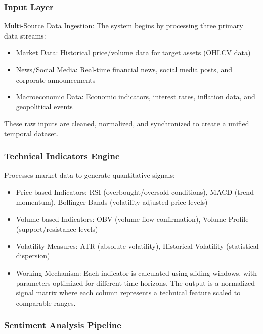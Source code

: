 \documentclass{singlecol-new}
\theoremstyle{TH}{
\newtheorem{lemma}{Lemma}
\newtheorem{theorem}[lemma]{Theorem}
\newtheorem{corrolary}[lemma]{Corrolary}
\newtheorem{conjecture}[lemma]{Conjecture}
\newtheorem{proposition}[lemma]{Proposition}
\newtheorem{claim}[lemma]{Claim}
\newtheorem{stheorem}[lemma]{Wrong Theorem}
\newtheorem{algorithm}{Algorithm}
}
\theoremstyle{THrm}{
\newtheorem{definition}{Definition}[section]
\newtheorem{question}{Question}[section]
\newtheorem{remark}{Remark}
\newtheorem{scheme}{Scheme}
}
\theoremstyle{THhit}{
\newtheorem{case}{Case}[section]
}
\begin{document}
\subsubsection{Input Layer}
Multi-Source Data Ingestion: 
The system begins by processing three primary data streams:
\begin{itemize}
    \item Market Data: Historical price/volume data for target assets (OHLCV data)
    \item News/Social Media: Real-time financial news, social media posts, and corporate announcements
    \item Macroeconomic Data: Economic indicators, interest rates, inflation data, and geopolitical events
\end{itemize}

These raw inputs are cleaned, normalized, and synchronized to create a unified temporal dataset.

\subsubsection{Technical Indicators Engine}

Processes market data to generate quantitative signals:
\begin{itemize}
    \item Price-based Indicators: RSI (overbought/oversold conditions), MACD (trend momentum), Bollinger Bands (volatility-adjusted price levels)
    \item Volume-based Indicators: OBV (volume-flow confirmation), Volume Profile (support/resistance levels)
    \item Volatility Measures: ATR (absolute volatility), Historical Volatility (statistical dispersion)
    \item Working Mechanism: Each indicator is calculated using sliding windows, with parameters optimized for different time horizons. The output is a normalized signal matrix where each column represents a technical feature scaled to comparable ranges.
\end{itemize}

\subsubsection{Sentiment Analysis Pipeline}
\end{document}
